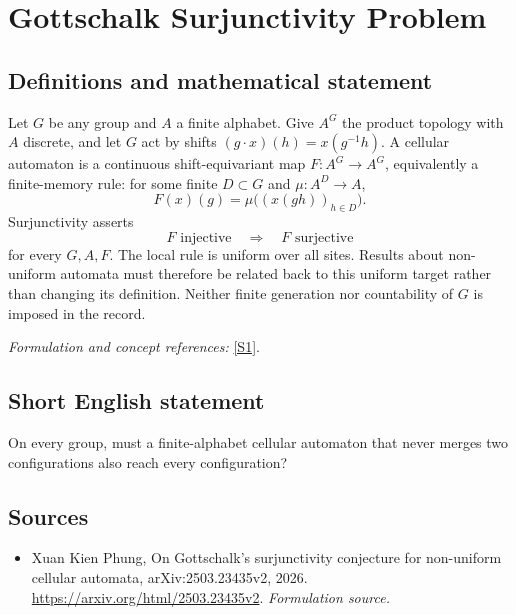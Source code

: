 \documentclass[11pt]{article}
\begin{document}
\section*{\texorpdfstring{Gottschalk Surjunctivity Problem}{Gottschalk Surjunctivity Problem}}\label{statement}
\subsection{Definitions and mathematical statement}
Let $G$ be any group and $A$ a finite alphabet. Give $A^G$ the product topology with $A$ discrete, and let $G$ act by shifts $(g\cdot x)(h)=x(g^{-1}h)$. A cellular automaton is a continuous shift-equivariant map $F:A^G\to A^G$, equivalently a finite-memory rule: for some finite $D\subset G$ and $\mu:A^D\to A$,
\[
 F(x)(g)=\mu\bigl((x(gh))_{h\in D}\bigr).
\]
Surjunctivity asserts
\[
 F\text{ injective}\quad\Longrightarrow\quad F\text{ surjective}
\]
for every $G,A,F$. The local rule is uniform over all sites. Results about non-uniform automata must therefore be related back to this uniform target rather than changing its definition. Neither finite generation nor countability of $G$ is imposed in the record.
\par\smallskip\textit{Formulation and concept references:} \href{https://arxiv.org/html/2503.23435v2}{[S1]}.

\subsection{Short English statement}
On every group, must a finite-alphabet cellular automaton that never merges two configurations also reach every configuration?
\subsection{Sources}
\begin{itemize}
\item[S1]Xuan Kien Phung, On Gottschalk's surjunctivity conjecture for non-uniform cellular automata, arXiv:2503.23435v2, 2026.
\url{https://arxiv.org/html/2503.23435v2}.
\textit{Formulation source.}
\end{itemize}
\end{document}
